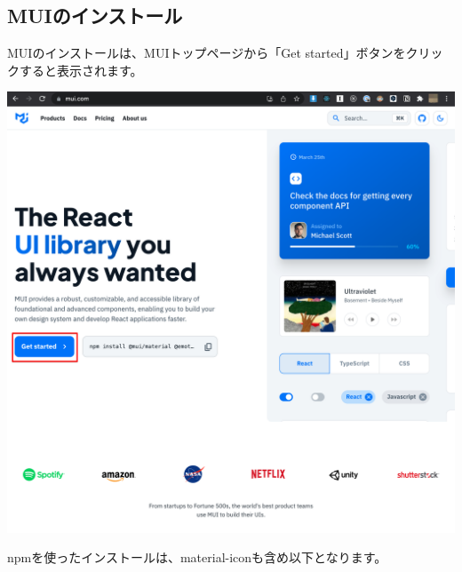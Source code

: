 \clearpage


\subsection{MUIのインストール}
\keeplastskip{
  \label{sec:3-3-1}
  \label{sec-0330Install}
  \par\nobreak
}

MUIのインストールは、MUIトップページから「Get started」ボタンをクリックすると表示されます。

\begin{reviewimage}%
\includegraphics[width=0.5\maxwidth]{./images/03-todo-with-react/mui000-mui-top.png}%
\label{image:03-todo-with-react:mui000-mui-top}
\end{reviewimage}

npmを使ったインストールは、material{-}iconも含め以下となります。

